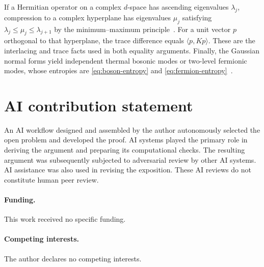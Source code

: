 \documentclass[11pt,a4paper]{article}
\numberwithin{equation}{section}
\theoremstyle{remark}
\begin{document}
If a Hermitian operator on a complex $d$-space has ascending eigenvalues $\lambda_j$, compression to a complex hyperplane has eigenvalues $\mu_j$ satisfying $\lambda_j\le\mu_j\le\lambda_{j+1}$ by the minimum--maximum principle~\cite{HornJohnson2013}. For a unit vector $p$ orthogonal to that hyperplane, the trace difference equals $\langle p,Kp\rangle$. These are the interlacing and trace facts used in both equality arguments. Finally, the Gaussian normal forms yield independent thermal bosonic modes or two-level fermionic modes, whose entropies are \eqref{eq:boson-entropy} and \eqref{eq:fermion-entropy}~\cite{Hackl2021}.

\section*{AI contribution statement}
An AI workflow designed and assembled by the author autonomously selected the open problem and developed the proof. AI systems played the primary role in deriving the argument and preparing its computational checks. The resulting argument was subsequently subjected to adversarial review by other AI systems. AI assistance was also used in revising the exposition. These AI reviews do not constitute human peer review.

\paragraph{Funding.}
This work received no specific funding.

\paragraph{Competing interests.}
The author declares no competing interests.
\end{document}
